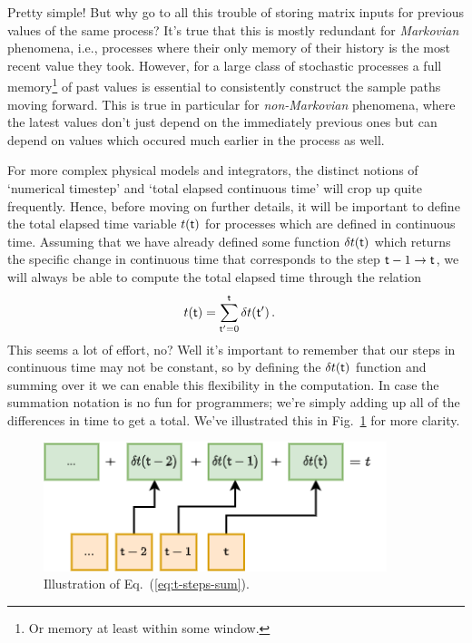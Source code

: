 Pretty simple! But why go to all this trouble of storing matrix inputs for previous values of the same process? It's true that this is mostly redundant for \emph{Markovian} phenomena, i.e., processes where their only memory of their history is the most recent value they took. However, for a large class of stochastic processes a full memory\footnote{Or memory at least within some window.} of past values is essential to consistently construct the sample paths moving forward. This is true in particular for \emph{non-Markovian} phenomena, where the latest values don't just depend on the immediately previous ones but can depend on values which occured much earlier in the process as well.

For more complex physical models and integrators, the distinct notions of `numerical timestep' and `total elapsed continuous time' will crop up quite frequently. Hence, before moving on further details, it will be important to define the total elapsed time variable $t({\sf t})$ for processes which are defined in continuous time. Assuming that we have already defined some function $\delta t({\sf t})$ which returns the specific change in continuous time that corresponds to the step ${\sf t}-1 \rightarrow {\sf t}$, we will always be able to compute the total elapsed time through the relation
\begin{align}
t({\sf t}) &= \sum^{{\sf t}}_{{\sf t}'=0}\delta t({\sf t}') \label{eq:t-steps-sum} \,.
\end{align}
This seems a lot of effort, no? Well it's important to remember that our steps in continuous time may not be constant, so by defining the $\delta t({\sf t})$ function and summing over it we can enable this flexibility in the computation. In case the summation notation is no fun for programmers; we're simply adding up all of the differences in time to get a total. We've illustrated this in Fig.~\ref{fig:time-step-summation} for more clarity.

\begin{figure}[h]
\centering
\includegraphics[width=10cm]{images/chapter-1-time-step-summation.drawio.png}
\caption{Illustration of Eq.~(\ref{eq:t-steps-sum}).}
\label{fig:time-step-summation}
\end{figure}


